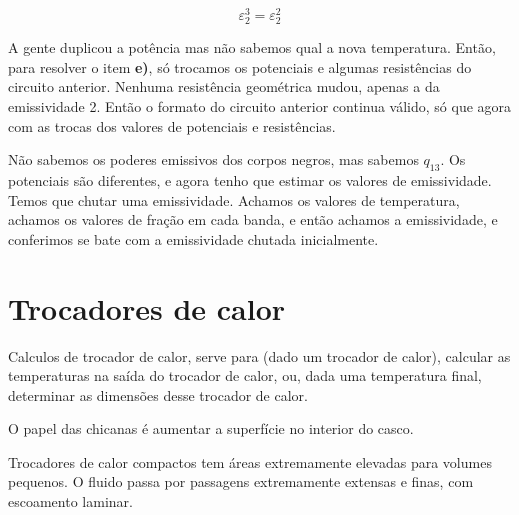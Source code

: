 \[\varepsilon _{2}^{3} = \varepsilon _{2}^{2}\]

A gente duplicou a potência mas não sabemos qual a nova temperatura. Então, para resolver o item \textbf{e)}, só trocamos os potenciais e algumas resistências do circuito anterior. Nenhuma resistência geométrica mudou, apenas a da emissividade 2. Então o formato do circuito anterior continua válido, só que agora com as trocas dos valores de potenciais e resistências. 

Não sabemos os poderes emissivos dos corpos negros, mas sabemos $q_{13}$. Os potenciais são diferentes, e agora tenho que estimar os valores de emissividade. Temos que chutar uma emissividade. Achamos os valores de temperatura, achamos os valores de fração em cada banda, e então achamos a emissividade, e conferimos se bate com a emissividade chutada inicialmente.

\section{Trocadores de calor}
Calculos de trocador de calor, serve para (dado um trocador de calor), calcular as temperaturas na saída do trocador de calor, ou, dada uma temperatura final, determinar as dimensões desse trocador de calor.

O papel das chicanas é aumentar a superfície no interior do casco.

Trocadores de calor compactos tem áreas extremamente elevadas para volumes pequenos.
O fluido passa por passagens extremamente extensas e finas, com escoamento laminar.